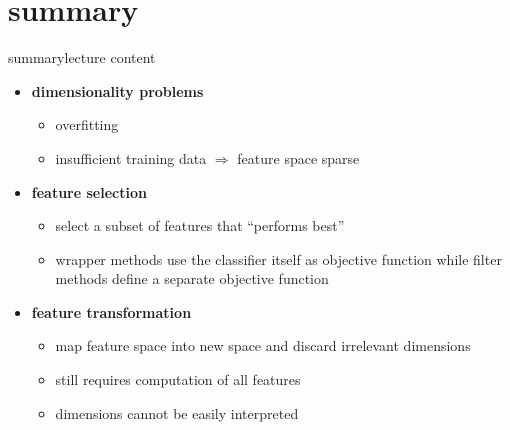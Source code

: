     \section{summary}
        \begin{frame}{summary}{lecture content}
            \begin{itemize}
                \item   \textbf{dimensionality problems}
                    \begin{itemize}
                        \item   overfitting
                        \item   insufficient training data $\Rightarrow$ feature space sparse
                    \end{itemize}
                \bigskip
                \item   \textbf{feature selection}
                    \begin{itemize}
                        \item   select a subset of features that ``performs best''
                        \item   wrapper methods use the classifier itself as objective function while filter methods define a separate objective function
                    \end{itemize}
                \bigskip
                \item   \textbf{feature transformation}
                    \begin{itemize}
                        \item   map feature space into new space and discard irrelevant dimensions
                        \item   still requires computation of all features
                        \item   dimensions cannot be easily interpreted
                    \end{itemize}
            \end{itemize}
        \end{frame}

